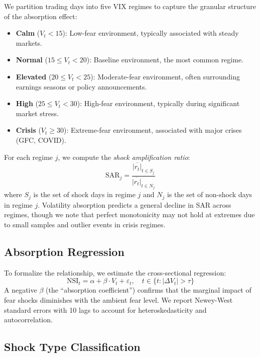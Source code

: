 \documentclass[12pt,a4paper]{article}
\begin{document}
We partition trading days into five VIX regimes to capture the granular structure of the absorption effect:
\begin{itemize}
    \item \textbf{Calm} ($V_t < 15$): Low-fear environment, typically associated with steady markets.
    \item \textbf{Normal} ($15 \leq V_t < 20$): Baseline environment, the most common regime.
    \item \textbf{Elevated} ($20 \leq V_t < 25$): Moderate-fear environment, often surrounding earnings seasons or policy announcements.
    \item \textbf{High} ($25 \leq V_t < 30$): High-fear environment, typically during significant market stress.
    \item \textbf{Crisis} ($V_t \geq 30$): Extreme-fear environment, associated with major crises (GFC, COVID).
\end{itemize}

For each regime $j$, we compute the \textit{shock amplification ratio}:
\begin{equation}
\text{SAR}_j = \frac{\overline{|r_t|}_{t \in S_j}}{\overline{|r_t|}_{t \in N_j}}
\label{eq:sar}
\end{equation}
where $S_j$ is the set of shock days in regime $j$ and $N_j$ is the set of non-shock days in regime $j$. Volatility absorption predicts a general decline in SAR across regimes, though we note that perfect monotonicity may not hold at extremes due to small samples and outlier events in crisis regimes.

\subsection{Absorption Regression}

To formalize the relationship, we estimate the cross-sectional regression:
\begin{equation}
\text{NSI}_t = \alpha + \beta \cdot V_t + \varepsilon_t, \quad t \in \{t : |\Delta V_t| > \tau\}
\label{eq:absorption_reg}
\end{equation}
A negative $\beta$ (the ``absorption coefficient'') confirms that the marginal impact of fear shocks diminishes with the ambient fear level. We report Newey-West standard errors with 10 lags to account for heteroskedasticity and autocorrelation.

\subsection{Shock Type Classification}
\end{document}
